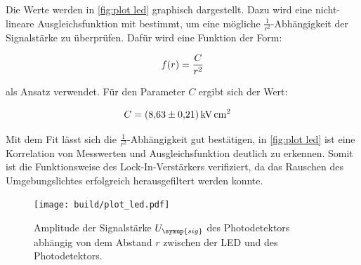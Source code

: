 Die Werte werden in \autoref{fig:plot led} graphisch dargestellt.
Dazu wird eine nicht-lineare Ausgleichsfunktion mit \cite{scipy} bestimmt, um eine mögliche $\frac{1}{r^2}$-Abhängigkeit der
Signalstärke zu überprüfen. Dafür wird eine Funktion der Form:

\begin{equation}
  f(r)=\frac{C}{r^2} \notag
\end{equation}

als Ansatz verwendet.
Für den Parameter $C$ ergibt sich der Wert:

\begin{align}
  C &= \qty{8.63+-0.21}{\kilo\volt\square\centi\metre} \notag
\end{align}

Mit dem Fit lässt sich die $\frac{1}{r^2}$-Abhängigkeit gut bestätigen, in \autoref{fig:plot led} ist eine Korrelation
von Messwerten und Ausgleichsfunktion deutlich zu erkennen.
Somit ist die Funktionsweise des Lock-In-Verstärkers verifiziert, da das Rauschen des Umgebungslichtes erfolgreich herausgefiltert
werden konnte.

\begin{figure}
  \centering
  \texttt{[image: build/plot\_led.pdf]}
  \caption{Amplitude der Signalstärke $U_{\symup{sig}}$ des Photodetektors abhängig von dem Abstand $r$ zwischen der LED und des Photodetektors.}
  \label{fig:plot led}
\end{figure}
